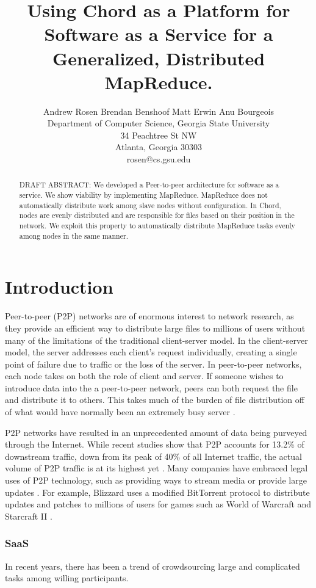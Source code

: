 \documentclass[conference, compsocconf, letterpaper]{IEEEtran}
\title{Using Chord as a Platform for Software as a Service for a Generalized, Distributed MapReduce.}
\author{
Andrew Rosen \qquad Brendan Benshoof \qquad Matt Erwin \qquad Anu Bourgeois  \\Department of Computer Science, Georgia State University\\ 34 Peachtree St NW \\ Atlanta, Georgia 30303\\  rosen@cs.gsu.edu }
\begin{document}
\maketitle

\begin{abstract}
DRAFT ABSTRACT:  We developed a Peer-to-peer architecture for software as a service. We show viability by implementing MapReduce.
MapReduce does not automatically distribute work among slave nodes without configuration.  In Chord, nodes are evenly distributed and  are responsible for files based on their position in the network. We exploit this property to automatically distribute MapReduce tasks evenly among nodes in the same manner. 
\end{abstract}


\section{Introduction}


Peer-to-peer (P2P) networks are of enormous interest to network research, as they provide an efficient way to distribute large files to millions of users without many of the limitations of the traditional client-server model. In the client-server model, the server addresses each client's request individually, creating a single point of failure due to traffic or the loss of the server.  In peer-to-peer networks, each node takes on both the role of client and server.  If someone wishes to introduce data into the a peer-to-peer network, peers can both request the file and distribute it to others.  This takes much of the burden of file distribution off of what would have normally been an extremely busy server \cite{Overview}.  

P2P networks have resulted in an unprecedented amount of data being purveyed through the Internet.  While recent studies show that P2P accounts for 13.2\% of downstream traffic, down from its peak of 40\% of all Internet traffic, the actual volume of P2P traffic is at its highest yet \cite{5713296}. Many companies have embraced legal uses of P2P technology, such as providing ways to stream media or provide large updates  \cite{P2PLegal}.  For example, Blizzard uses a modified BitTorrent protocol to distribute updates and patches to millions of users for games such as World of Warcraft and Starcraft II \cite{chehai2006analysis}.



\subsubsection{SaaS}
In recent years, there has been a trend of crowdsourcing large and complicated tasks among willing participants.  
\end{document}
